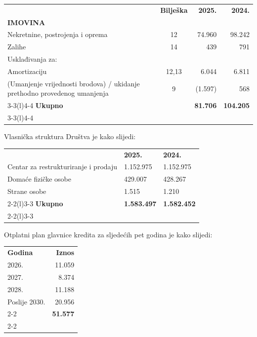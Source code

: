 \documentclass[a4paper,10pt]{article}
\begin{document}
{\small
\begin{tabular}{@{}p{6.5cm}crr@{}}
 & \textbf{Bilješka} & \textbf{2025.} & \textbf{2024.} \\[2.2em]
\textbf{IMOVINA} & & & \\
Nekretnine, postrojenja i oprema & 12 & 74.960 & 98.242 \\
Zalihe & 14 & 439 & 791 \\
Usklađivanja za: & & & \\
Amortizaciju & 12,13 & 6.044 & 6.811 \\
(Umanjenje vrijednosti brodova) / ukidanje prethodno provedenog umanjenja & 9 & (1.597) & 568 \\ \cmidrule(lr){3-3}\cmidrule(l){4-4}
\textbf{Ukupno} & & \textbf{81.706} & \textbf{104.205} \\ \cmidrule(lr){3-3}\cmidrule(l){4-4}
\end{tabular}}

\vspace{3em}
Vlasnička struktura Društva je kako slijedi:

\vspace{1em}
{\small
\begin{tabular}{@{}m{4cm}m{2cm}<{\raggedleft}m{2cm}<{\raggedleft}@{}}
 & \textbf{2025.} & \textbf{2024.} \\
Centar za restrukturiranje i prodaju & 1.152.975 & 1.152.975 \\
Domaće fizičke osobe & 429.007 & 428.267 \\
Strane osobe & 1.515 & 1.210 \\ \cmidrule(lr){2-2}\cmidrule(l){3-3}
\textbf{Ukupno} & \textbf{1.583.497} & \textbf{1.582.452} \\ \cmidrule(lr){2-2}\cmidrule(l){3-3}
\end{tabular}}

\vspace{3em}
Otplatni plan glavnice kredita za sljedećih pet godina je kako slijedi:

\vspace{1em}
{\small
\begin{tabular}{@{}p{3cm}r@{}}
\textbf{Godina} & \textbf{Iznos} \\[1em]
2026. & 11.059 \\
2027. & 8.374 \\
2028. & 11.188 \\
Poslije 2030. & 20.956 \\ \cmidrule(l){2-2}
 & \textbf{51.577} \\ \cmidrule(l){2-2}
\end{tabular}}
\end{document}
